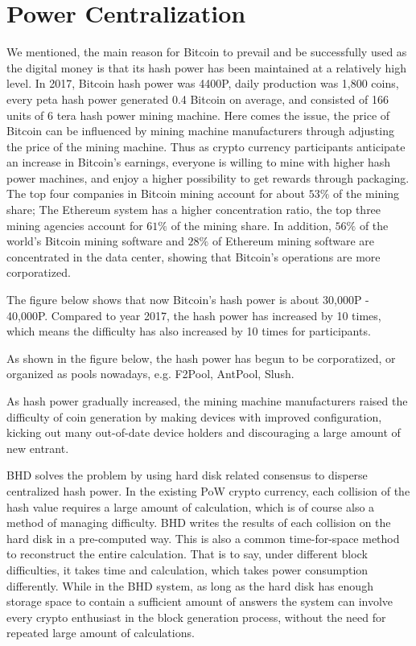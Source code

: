 \section{Power Centralization}
\begin{flushleft}
    We mentioned, the main reason for Bitcoin to prevail and be successfully used as the digital money is that its hash power has been maintained at a relatively high level. In 2017, Bitcoin hash power was 4400P, daily production was 1,800 coins, every peta hash power generated 0.4 Bitcoin on average, and consisted of 166 units of 6 tera hash power mining machine. Here comes the issue, the price of Bitcoin can be influenced by mining machine manufacturers through adjusting the price of the mining machine. Thus as crypto currency participants anticipate an increase in Bitcoin's earnings, everyone is willing to mine with higher hash power machines, and enjoy a higher possibility to get rewards through packaging. The top four companies in Bitcoin mining account for about $53\%$ of the mining share; The Ethereum system has a higher concentration ratio, the top three mining agencies account for $61\%$ of the mining share. In addition, $56\%$ of the world's Bitcoin mining software and $28\%$ of Ethereum mining software are concentrated in the data center, showing that Bitcoin's operations are more corporatized.
\end{flushleft}
\begin{flushleft}
    The figure below shows that now Bitcoin's hash power is about 30,000P - 40,000P. Compared to year 2017, the hash power has increased by 10 times, which means the difficulty has also increased by 10 times for participants.
\end{flushleft}
\begin{flushleft}
    As shown in the figure below, the hash power has begun to be corporatized, or organized as pools nowadays, e.g. F2Pool, AntPool, Slush.
\end{flushleft}

\begin{flushleft}
    As hash power gradually increased, the mining machine manufacturers raised the difficulty of coin generation by making devices with improved configuration, kicking out many out-of-date device holders and discouraging a large amount of new entrant.
\end{flushleft}
\begin{flushleft}
    BHD solves the problem by using hard disk related consensus to disperse centralized hash power. In the existing PoW crypto currency, each collision of the hash value requires a large amount of calculation, which is of course also a method of managing difficulty. BHD writes the results of each collision on the hard disk in a pre-computed way. This is also a common time-for-space method to reconstruct the entire calculation. That is to say, under different block difficulties, it takes time and calculation, which takes power consumption differently. While in the BHD system, as long as the hard disk has enough storage space to contain a sufficient amount of answers the system can involve every crypto enthusiast in the block generation process, without the need for repeated large amount of calculations.
\end{flushleft}
